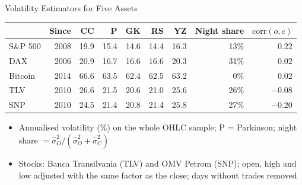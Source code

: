 \begin{frame}{Volatility Estimators for Five Assets}
\itemsize{\footnotesize}
\begin{center}
\footnotesize
\begin{tabular}{lrrrrrrrr}
\toprule
& \textbf{Since} & \textbf{CC} & \textbf{P} & \textbf{GK} & \textbf{RS} & \textbf{YZ} & \textbf{Night share} & $\mathrm{corr}(o, c)$ \\
\midrule
S\&P 500 & 2008 & 19.9 & 15.4 & 14.6 & 14.4 & 16.3 & 13\% & ${0.22}$ \\
DAX & 2006 & 20.9 & 16.7 & 16.6 & 16.6 & 20.3 & 31\% & ${0.02}$ \\
Bitcoin & 2014 & 66.6 & 63.5 & 62.4 & 62.5 & 63.2 & 0\% & ${0.02}$ \\
TLV & 2010 & 26.6 & 21.5 & 20.6 & 21.0 & 25.6 & 26\% & ${-0.08}$ \\
SNP & 2010 & 24.5 & 21.4 & 20.8 & 21.4 & 25.8 & 27\% & ${-0.20}$ \\
\bottomrule
\end{tabular}
\end{center}
\begin{itemize}
    \item Annualised volatility (\%) on the whole OHLC sample; P = Parkinson; night share $= \hat\sigma_O^2/(\hat\sigma_O^2 + \hat\sigma_C^2)$
    \item Stocks: Banca Transilvania (TLV) and OMV Petrom (SNP); open, high and low adjusted with the same factor as the close; days without trades removed
\end{itemize}
\end{frame}

